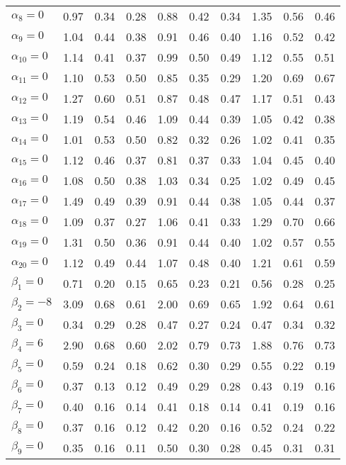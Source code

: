 \begin{table}[htbp]
\begin{tabular}{l|ccc|ccc|ccc}
  $\alpha_8=0$ & 0.97 & 0.34 & 0.28 & 0.88 & 0.42 & 0.34 & 1.35 & 0.56 & 0.46 \\ 
  $\alpha_9=0$ & 1.04 & 0.44 & 0.38 & 0.91 & 0.46 & 0.40 & 1.16 & 0.52 & 0.42 \\ 
  $\alpha_{10}=0$ & 1.14 & 0.41 & 0.37 & 0.99 & 0.50 & 0.49 & 1.12 & 0.55 & 0.51 \\ 
  $\alpha_{11}=0$ & 1.10 & 0.53 & 0.50 & 0.85 & 0.35 & 0.29 & 1.20 & 0.69 & 0.67 \\ 
  $\alpha_{12}=0$ & 1.27 & 0.60 & 0.51 & 0.87 & 0.48 & 0.47 & 1.17 & 0.51 & 0.43 \\ 
  $\alpha_{13}=0$ & 1.19 & 0.54 & 0.46 & 1.09 & 0.44 & 0.39 & 1.05 & 0.42 & 0.38 \\ 
  $\alpha_{14}=0$ & 1.01 & 0.53 & 0.50 & 0.82 & 0.32 & 0.26 & 1.02 & 0.41 & 0.35 \\ 
  $\alpha_{15}=0$ & 1.12 & 0.46 & 0.37 & 0.81 & 0.37 & 0.33 & 1.04 & 0.45 & 0.40 \\ 
  $\alpha_{16}=0$ & 1.08 & 0.50 & 0.38 & 1.03 & 0.34 & 0.25 & 1.02 & 0.49 & 0.45 \\ 
  $\alpha_{17}=0$ & 1.49 & 0.49 & 0.39 & 0.91 & 0.44 & 0.38 & 1.05 & 0.44 & 0.37 \\ 
  $\alpha_{18}=0$ & 1.09 & 0.37 & 0.27 & 1.06 & 0.41 & 0.33 & 1.29 & 0.70 & 0.66 \\ 
  $\alpha_{19}=0$ & 1.31 & 0.50 & 0.36 & 0.91 & 0.44 & 0.40 & 1.02 & 0.57 & 0.55 \\ 
  $\alpha_{20}=0$ & 1.12 & 0.49 & 0.44 & 1.07 & 0.48 & 0.40 & 1.21 & 0.61 & 0.59 \\ 
  $\beta_1=0$ & 0.71 & 0.20 & 0.15 & 0.65 & 0.23 & 0.21 & 0.56 & 0.28 & 0.25 \\ 
  $\beta_2=-8$ & 3.09 & 0.68 & 0.61 & 2.00 & 0.69 & 0.65 & 1.92 & 0.64 & 0.61 \\ 
  $\beta_3=0$ & 0.34 & 0.29 & 0.28 & 0.47 & 0.27 & 0.24 & 0.47 & 0.34 & 0.32 \\ 
  $\beta_4=6$ & 2.90 & 0.68 & 0.60 & 2.02 & 0.79 & 0.73 & 1.88 & 0.76 & 0.73 \\ 
  $\beta_5=0$ & 0.59 & 0.24 & 0.18 & 0.62 & 0.30 & 0.29 & 0.55 & 0.22 & 0.19 \\ 
  $\beta_6=0$ & 0.37 & 0.13 & 0.12 & 0.49 & 0.29 & 0.28 & 0.43 & 0.19 & 0.16 \\ 
  $\beta_7=0$ & 0.40 & 0.16 & 0.14 & 0.41 & 0.18 & 0.14 & 0.41 & 0.19 & 0.16 \\ 
  $\beta_8=0$ & 0.37 & 0.16 & 0.12 & 0.42 & 0.20 & 0.16 & 0.52 & 0.24 & 0.22 \\ 
  $\beta_9=0$ & 0.35 & 0.16 & 0.11 & 0.50 & 0.30 & 0.28 & 0.45 & 0.31 & 0.31 \\ 

\end{tabular}
\end{table}
